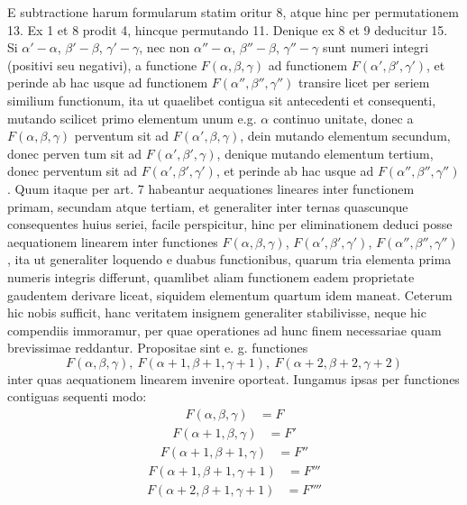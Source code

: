 E subtractione harum formularum statim oritur 8, atque hinc per permutationem 13. Ex 1 et 8 prodit 4, hincque permutando 11. Denique ex 8 et 9
deducitur 15.
Si $\alpha'-\alpha$, $\beta'-\beta$, $\gamma'-\gamma$, nec non $\alpha''-\alpha$, $\beta''-\beta$, $\gamma''-\gamma$ sunt numeri integri (positivi seu negativi), a functione $F(\alpha,\beta,\gamma)$ ad functionem $F(\alpha',\beta',\gamma')$,
et perinde ab hac usque ad functionem $F(\alpha'',\beta'',\gamma'')$ transire licet per seriem similium functionum, ita ut quaelibet contigua sit antecedenti et consequenti, mutando scilicet primo elementum unum e.g. $\alpha$ continuo unitate, donec a $F(\alpha,\beta,\gamma)$
perventum sit ad $F(\alpha',\beta,\gamma)$, dein mutando elementum secundum, donec perven%
tum sit ad $F(\alpha',\beta',\gamma)$, denique mutando elementum tertium, donec perventum sit
ad $F(\alpha',\beta',\gamma')$, et perinde ab hac usque ad $F(\alpha'',\beta'',\gamma'')$. Quum itaque per art. 7
habeantur aequationes lineares inter functionem primam, secundam atque tertiam,
et generaliter inter ternas quascunque consequentes huius seriei, facile perspicitur, hinc per eliminationem deduci posse aequationem linearem inter functiones
$F(\alpha,\beta,\gamma)$, $F(\alpha',\beta',\gamma')$, $F(\alpha'',\beta'',\gamma'')$, ita ut generaliter loquendo e duabus functionibus, quarum tria elementa prima numeris integris differunt, quamlibet aliam
functionem eadem proprietate gaudentem derivare liceat, siquidem elementum
quartum idem maneat. Ceterum hic nobis sufficit, hanc veritatem insignem generaliter stabilivisse, neque hic compendiis immoramur, per quae operationes ad
hunc finem necessariae quam brevissimae reddantur.
Propositae sint e. g. functiones
\[
F(\alpha,\beta,\gamma),\ F(\alpha+1,\beta+1,\gamma+1),\ F(\alpha+2,\beta+2,\gamma+2)
\]
inter quas aequationem linearem invenire oporteat. Iungamus ipsas per functiones contiguas sequenti modo:
\[
\begin{array}{rl}
F(\alpha,\beta,\gamma)&=F
\end{array}
\]
\[
\begin{array}{rl}
F(\alpha+1,\beta,\gamma)&=F'
\end{array}
\]
\[
\begin{array}{rl}
F(\alpha+1,\beta+1,\gamma)&=F''
\end{array}
\]
\[
\begin{array}{rl}
F(\alpha+1,\beta+1,\gamma+1)&=F'''
\end{array}
\]
\[
\begin{array}{rl}
F(\alpha+2,\beta+1,\gamma+1)&=F''''
\end{array}
\]
